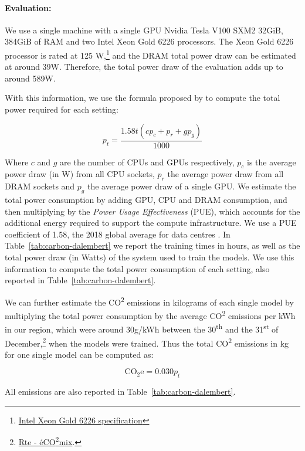 \paragraph{Evaluation:} We use a single machine with a single GPU Nvidia Tesla V100 SXM2 32GiB, 384GiB of RAM and two Intel Xeon Gold 6226 processors. The Xeon Gold 6226 processor is rated at 125 W,\footnote{\href{https://ark.intel.com/content/www/us/en/ark/products/193957/intel-xeon-gold-6226-processor-19-25m-cache-2-70-ghz.html}{Intel Xeon Gold 6226 specification}} and the DRAM total power draw can be estimated at around 39W. Therefore, the total power draw of the evaluation adds up to around 589W.

With this information, we use the formula proposed by  to compute the total power required for each setting:

\begin{equation*}
    p_t = \frac{1.58t(cp_{c} + p_r + gp_g)}{1000}
\end{equation*}

Where $c$ and $g$ are the number of CPUs and GPUs respectively, $p_c$ is the average power draw (in W) from all CPU sockets, $p_r$ the average power draw from all DRAM sockets and $p_g$ the average power draw of a single GPU. We estimate the total power consumption by adding GPU, CPU and DRAM consumption, and then multiplying by the \emph{Power Usage Effectiveness} (PUE), which accounts for the additional energy required to support the compute infrastructure. We use a PUE coefficient of 1.58, the 2018 global average for data centres \cite{strubell-etal-2019-energy}. In Table~\ref{tab:carbon-dalembert} we report the training times in hours, as well as the total power draw (in Watts) of the system used to train the models. We use this information to compute the total power consumption of each setting, also reported in Table~\ref{tab:carbon-dalembert}.

We can further estimate the CO\textsuperscript{2} emissions in kilograms of each single model by multiplying the total power consumption by the average CO\textsuperscript{2} emissions per kWh in our region, which were around 30g/kWh between the 30\textsuperscript{th} and the 31\textsuperscript{st} of December,\footnote{\href{https://www.rte-france.com/eco2mix/les-emissions-de-co2-par-kwh-produit-en-france}{Rte - éCO\textsuperscript{2}mix}.} when the models were trained. Thus the total CO\textsuperscript{2} emissions in kg for one single model can be computed as:

\begin{equation*}
    \text{CO}_{2}\text{e} = 0.030 p_t
\end{equation*}

All emissions are also reported in Table~\ref{tab:carbon-dalembert}.